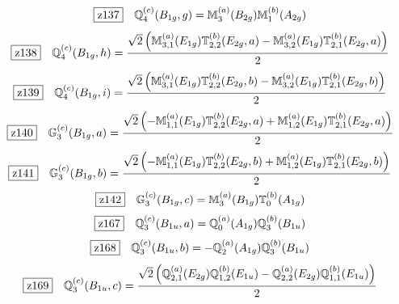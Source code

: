 \documentclass[fleqn,10pt,landscape]{jsarticle}
\begin{document}
\begin{dmath*}
\hspace*{3mm}\fbox{z137}\quad \mathbb{Q}_{4}^{(c)}(B_{1g},g)=\mathbb{M}_{3}^{(a)}(B_{2g}) \mathbb{M}_{1}^{(b)}(A_{2g})
\end{dmath*}
\begin{dmath*}
\hspace*{3mm}\fbox{z138}\quad \mathbb{Q}_{4}^{(c)}(B_{1g},h)=\frac{\sqrt{2} \left(\mathbb{M}_{3,1}^{(a)}(E_{1g}) \mathbb{T}_{2,2}^{(b)}(E_{2g},a) - \mathbb{M}_{3,2}^{(a)}(E_{1g}) \mathbb{T}_{2,1}^{(b)}(E_{2g},a)\right)}{2}
\end{dmath*}
\begin{dmath*}
\hspace*{3mm}\fbox{z139}\quad \mathbb{Q}_{4}^{(c)}(B_{1g},i)=\frac{\sqrt{2} \left(\mathbb{M}_{3,1}^{(a)}(E_{1g}) \mathbb{T}_{2,2}^{(b)}(E_{2g},b) - \mathbb{M}_{3,2}^{(a)}(E_{1g}) \mathbb{T}_{2,1}^{(b)}(E_{2g},b)\right)}{2}
\end{dmath*}
\begin{dmath*}
\hspace*{3mm}\fbox{z140}\quad \mathbb{G}_{3}^{(c)}(B_{1g},a)=\frac{\sqrt{2} \left(- \mathbb{M}_{1,1}^{(a)}(E_{1g}) \mathbb{T}_{2,2}^{(b)}(E_{2g},a) + \mathbb{M}_{1,2}^{(a)}(E_{1g}) \mathbb{T}_{2,1}^{(b)}(E_{2g},a)\right)}{2}
\end{dmath*}
\begin{dmath*}
\hspace*{3mm}\fbox{z141}\quad \mathbb{G}_{3}^{(c)}(B_{1g},b)=\frac{\sqrt{2} \left(- \mathbb{M}_{1,1}^{(a)}(E_{1g}) \mathbb{T}_{2,2}^{(b)}(E_{2g},b) + \mathbb{M}_{1,2}^{(a)}(E_{1g}) \mathbb{T}_{2,1}^{(b)}(E_{2g},b)\right)}{2}
\end{dmath*}
\begin{dmath*}
\hspace*{3mm}\fbox{z142}\quad \mathbb{G}_{3}^{(c)}(B_{1g},c)=\mathbb{M}_{3}^{(a)}(B_{1g}) \mathbb{T}_{0}^{(b)}(A_{1g})
\end{dmath*}
\begin{dmath*}
\hspace*{3mm}\fbox{z167}\quad \mathbb{Q}_{3}^{(c)}(B_{1u},a)=\mathbb{Q}_{0}^{(a)}(A_{1g}) \mathbb{Q}_{3}^{(b)}(B_{1u})
\end{dmath*}
\begin{dmath*}
\hspace*{3mm}\fbox{z168}\quad \mathbb{Q}_{3}^{(c)}(B_{1u},b)=- \mathbb{Q}_{2}^{(a)}(A_{1g}) \mathbb{Q}_{3}^{(b)}(B_{1u})
\end{dmath*}
\begin{dmath*}
\hspace*{3mm}\fbox{z169}\quad \mathbb{Q}_{3}^{(c)}(B_{1u},c)=\frac{\sqrt{2} \left(\mathbb{Q}_{2,1}^{(a)}(E_{2g}) \mathbb{Q}_{1,2}^{(b)}(E_{1u}) - \mathbb{Q}_{2,2}^{(a)}(E_{2g}) \mathbb{Q}_{1,1}^{(b)}(E_{1u})\right)}{2}
\end{dmath*}
\end{document}
